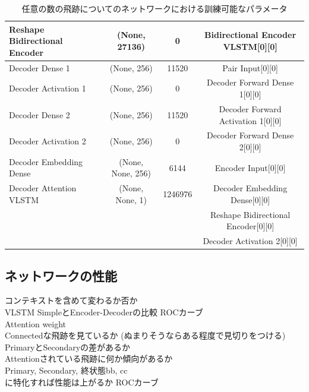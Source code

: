 \begin{table}[htb]
{\begin{tabular}{l c c c}
    Reshape Bidirectional Encoder & (None, 27136) & 0 & Bidirectional Encoder VLSTM[0][0]\\\hline\hline
    Decoder Dense 1 & (None, 256)　& 11520 & Pair Input[0][0]\\\hline
    Decoder Activation 1 & (None, 256)　& 0 & Decoder Forward Dense 1[0][0]\\\hline
    Decoder Dense 2 & (None, 256)　& 11520 & Decoder Forward Activation 1[0][0]\\\hline
    Decoder Activation 2 & (None, 256)　& 0 & Decoder Forward Dense 2[0][0]\\\hline\hline
    Decoder Embedding Dense & (None, None, 256) & 6144 & Encoder Input[0][0]\\\hline\hline
    Decoder Attention VLSTM & (None, None, 1) & 1246976 & Decoder Embedding Dense[0][0]\\
                                                                                                   &&& Reshape Bidirectional Encoder[0][0]\\                    
                                                                                                   &&& Decoder Activation 2[0][0]\\\hline\hline
  \end{tabular}
  }
  \caption{任意の数の飛跡についてのネットワークにおける訓練可能なパラメータ}
  \label{ParametersforVLSTMModel}
\end{table}


\subsection{ネットワークの性能} \label{Net:VLSTM:PerformanceofVLSTM}

コンテキストを含めて変わるか否か\\
VLSTM SimpleとEncoder-Decoderの比較 ROCカーブ\\

Attention weight\\
Connectedな飛跡を見ているか (ぬまりそうならある程度で見切りをつける)\\
PrimaryとSecondaryの差があるか\\
Attentionされている飛跡に何か傾向があるか\\

Primary, Secondary, 終状態bb, cc\\
に特化すれば性能は上がるか ROCカーブ\\









